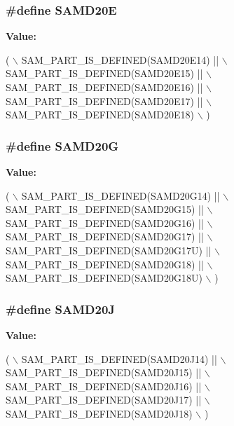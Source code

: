 \subsubsection[{S\+A\+M\+D20\+E}]{\setlength{\rightskip}{0pt plus 5cm}\#define S\+A\+M\+D20\+E}\label{group__sam__part__macros__group_ga4540be1fa82a17932c6000a0919806b0}
{\bfseries Value\+:}
\begin{DoxyCode}
( \(\backslash\)
        SAM\_PART\_IS\_DEFINED(SAMD20E14) || \(\backslash\)
        SAM\_PART\_IS\_DEFINED(SAMD20E15) || \(\backslash\)
        SAM\_PART\_IS\_DEFINED(SAMD20E16) || \(\backslash\)
        SAM\_PART\_IS\_DEFINED(SAMD20E17) || \(\backslash\)
        SAM\_PART\_IS\_DEFINED(SAMD20E18) \(\backslash\)
    )
\end{DoxyCode}
\hypertarget{group__sam__part__macros__group_ga98be0064016617a8ce1449905046f81a}{}
\subsubsection[{S\+A\+M\+D20\+G}]{\setlength{\rightskip}{0pt plus 5cm}\#define S\+A\+M\+D20\+G}\label{group__sam__part__macros__group_ga98be0064016617a8ce1449905046f81a}
{\bfseries Value\+:}
\begin{DoxyCode}
( \(\backslash\)
        SAM\_PART\_IS\_DEFINED(SAMD20G14)  || \(\backslash\)
        SAM\_PART\_IS\_DEFINED(SAMD20G15)  || \(\backslash\)
        SAM\_PART\_IS\_DEFINED(SAMD20G16)  || \(\backslash\)
        SAM\_PART\_IS\_DEFINED(SAMD20G17)  || \(\backslash\)
        SAM\_PART\_IS\_DEFINED(SAMD20G17U) || \(\backslash\)
        SAM\_PART\_IS\_DEFINED(SAMD20G18)  || \(\backslash\)
        SAM\_PART\_IS\_DEFINED(SAMD20G18U) \(\backslash\)
    )
\end{DoxyCode}
\hypertarget{group__sam__part__macros__group_ga5f1a6d04b67f9e1eceb737aea3ece8c8}{}
\subsubsection[{S\+A\+M\+D20\+J}]{\setlength{\rightskip}{0pt plus 5cm}\#define S\+A\+M\+D20\+J}\label{group__sam__part__macros__group_ga5f1a6d04b67f9e1eceb737aea3ece8c8}
{\bfseries Value\+:}
\begin{DoxyCode}
( \(\backslash\)
        SAM\_PART\_IS\_DEFINED(SAMD20J14) || \(\backslash\)
        SAM\_PART\_IS\_DEFINED(SAMD20J15) || \(\backslash\)
        SAM\_PART\_IS\_DEFINED(SAMD20J16) || \(\backslash\)
        SAM\_PART\_IS\_DEFINED(SAMD20J17) || \(\backslash\)
        SAM\_PART\_IS\_DEFINED(SAMD20J18) \(\backslash\)
    )
\end{DoxyCode}
\hypertarget{group__sam__part__macros__group_gab9217b15071242235d3014381d61dbf7}{}
